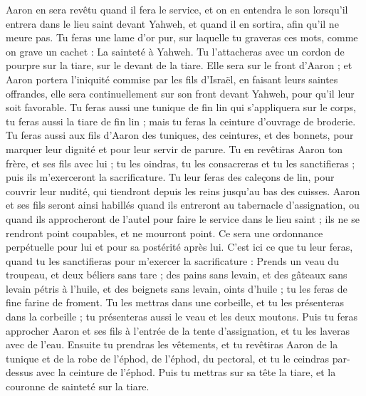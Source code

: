 \begin{multicols}{2}
Aaron en sera revêtu quand il fera le service, et on en entendra le son lorsqu'il entrera dans le lieu saint devant Yahweh, et quand il en sortira, afin qu'il ne meure pas.
Tu feras une lame d’or pur, sur laquelle tu graveras ces mots, comme on grave un cachet : La sainteté à Yahweh.
Tu l’attacheras avec un cordon de pourpre sur la tiare, sur le devant de la tiare.
Elle sera sur le front d'Aaron ; et Aaron portera l'iniquité commise par les fils d’Israël, en faisant leurs saintes offrandes, elle sera continuellement sur son front devant Yahweh, pour qu’il leur soit favorable.
Tu feras aussi une tunique de fin lin qui s'appliquera sur le corps, tu feras aussi la tiare de fin lin ; mais tu feras la ceinture d'ouvrage de broderie.
Tu feras aussi aux fils d'Aaron des tuniques, des ceintures, et des bonnets, pour marquer leur dignité et pour leur servir de parure.
Tu en revêtiras Aaron ton frère, et ses fils avec lui ; tu les oindras, tu les consacreras et tu les sanctifieras ; puis ils m'exerceront la sacrificature.
Tu leur feras des caleçons de lin, pour couvrir leur nudité, qui tiendront depuis les reins jusqu'au bas des cuisses.
Aaron et ses fils seront ainsi habillés quand ils entreront au tabernacle d'assignation, ou quand ils approcheront de l'autel pour faire le service dans le lieu saint ; ils ne se rendront point coupables, et ne mourront point. Ce sera une ordonnance perpétuelle pour lui et pour sa postérité après lui.
\VerseOne{}C'est ici ce que tu leur feras, quand tu les sanctifieras pour m'exercer la sacrificature : Prends un veau du troupeau, et deux béliers sans tare ;
des pains sans levain, et des gâteaux sans levain pétris à l'huile, et des beignets sans levain, oints d'huile ; tu les feras de fine farine de froment.
Tu les mettras dans une corbeille, et tu les présenteras dans la corbeille ; tu présenteras aussi le veau et les deux moutons.
Puis tu feras approcher Aaron et ses fils à l'entrée de la tente d'assignation, et tu les laveras avec de l'eau.
Ensuite tu prendras les vêtements, et tu revêtiras Aaron de la tunique et de la robe de l'éphod, de l'éphod, du pectoral, et tu le ceindras par-dessus avec la ceinture de l'éphod.
Puis tu mettras sur sa tête la tiare, et la couronne de sainteté sur la tiare.

\end{multicols}
